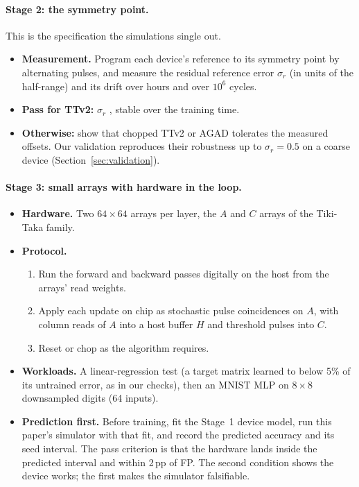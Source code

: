 \paragraph{Stage 2: the symmetry point.} This is the specification the simulations single out.
\begin{itemize}
\item \textbf{Measurement.} Program each device's reference to its symmetry point by alternating pulses, and measure the
      residual reference error $\sigma_r$ (in units of the half-range) and its drift over hours and over $10^6$ cycles.
\item \textbf{Pass for TTv2:} $\sigma_r$ \RSpecrelTtvTwoCifarWThreeTwoRefErr{}, stable over the training time.
\item \textbf{Otherwise:} show that chopped TTv2 or AGAD tolerates the measured offsets. Our validation reproduces their
      robustness up to $\sigma_r=0.5$ on a coarse device (Section~\ref{sec:validation}).
\end{itemize}

\paragraph{Stage 3: small arrays with hardware in the loop.}
\begin{itemize}
\item \textbf{Hardware.} Two $64\times64$ arrays per layer, the $A$ and $C$ arrays of the Tiki-Taka family.
\item \textbf{Protocol.}
      \begin{enumerate}
      \item Run the forward and backward passes digitally on the host from the arrays' read weights.
      \item Apply each update on chip as stochastic pulse coincidences on $A$, with column reads of $A$ into a host buffer $H$
            and threshold pulses into $C$.
      \item Reset or chop as the algorithm requires.
      \end{enumerate}
\item \textbf{Workloads.} A linear-regression test (a target matrix learned to below 5\% of its untrained error, as in our
      checks), then an MNIST MLP on $8\times8$ downsampled digits (64 inputs).
\item \textbf{Prediction first.} Before training, fit the Stage~1 device model, run this paper's simulator with that fit, and
      record the predicted accuracy and its seed interval. The pass criterion is that the hardware lands inside the predicted
      interval and within 2\,pp of FP. The second condition shows the device works; the first makes the simulator falsifiable.
\end{itemize}

